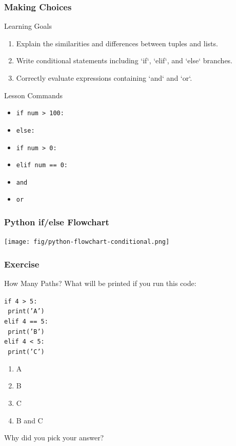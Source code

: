 \documentclass{beamer}
\begin{document}
\begin{frame}[label=conditionals]
  \frametitle{Making Choices}
  \begin{block}{Learning Goals}
    \begin{enumerate}
      \item Explain the similarities and differences between tuples and lists.
      \item Write conditional statements including `if`, `elif`, and `else` branches.
      \item Correctly evaluate expressions containing `and` and `or`.
    \end{enumerate}
  \end{block}
  \begin{block}{Lesson Commands}
    \begin{itemize}
      \item \texttt{if num > 100:}
      \item \texttt{else:}
      \item \texttt{if num > 0:}
      \item \texttt{elif num == 0:}
      \item \texttt{and}
      \item \texttt{or}
    \end{itemize}
  \end{block}
\end{frame}


\begin{frame}
  \frametitle{Python if/else Flowchart}
  \texttt{[image: fig/python-flowchart-conditional.png]}
\end{frame}


\begin{frame}
  \frametitle{Exercise}
  \begin{block}{How Many Paths?}
    What will be printed if you run this code:

    \texttt{if 4 > 5:}\\
    \texttt{    print('A')}\\
    \texttt{elif 4 == 5:}\\
    \texttt{    print('B')}\\
    \texttt{elif 4 < 5:}\\
    \texttt{    print('C')}\\

    \begin{enumerate}
      \item A
      \item B
      \item C
      \item B and C
    \end{enumerate}

    Why did you pick your answer?

  \end{block}
\end{frame}
\end{document}
